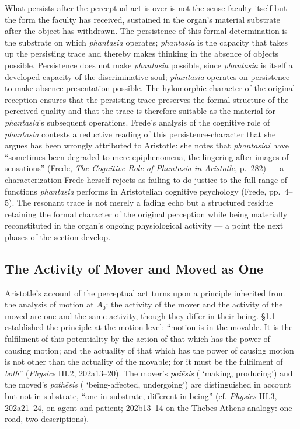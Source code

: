 What persists after the perceptual act is over is not the sense faculty itself but the form the faculty has received, sustained in the organ's material substrate after the object has withdrawn. The persistence of this formal determination is the substrate on which \textit{phantasia} operates; \textit{phantasia} is the capacity that takes up the persisting trace and thereby makes thinking in the absence of objects possible. Persistence does not make \textit{phantasia} possible, since \textit{phantasia} is itself a developed capacity of the discriminative soul; \textit{phantasia} operates on persistence to make absence-presentation possible. The hylomorphic character of the original reception ensures that the persisting trace preserves the formal structure of the perceived quality and that the trace is therefore suitable as the material for \textit{phantasia}'s subsequent operations. Frede's analysis of the cognitive role of \textit{phantasia} contests a reductive reading of this persistence-character that she argues has been wrongly attributed to Aristotle: she notes that \textit{phantasiai} have ``sometimes been degraded to mere epiphenomena, the lingering after-images of sensations'' (Frede, \textit{The Cognitive Role of Phantasia in Aristotle}, p.~282) --- a characterization Frede herself rejects as failing to do justice to the full range of functions \textit{phantasia} performs in Aristotelian cognitive psychology (Frede, pp.~4--5). The resonant trace is not merely a fading echo but a structured residue retaining the formal character of the original perception while being materially reconstituted in the organ's ongoing physiological activity --- a point the next phases of the section develop.

\subsection{The Activity of Mover and Moved as One}

Aristotle's account of the perceptual act turns upon a principle inherited from the analysis of motion at $A_0$: the activity of the mover and the activity of the moved are one and the same activity, though they differ in their being. §1.1 established the principle at the motion-level: ``motion is in the movable. It is the fulfilment of this potentiality by the action of that which has the power of causing motion; and the actuality of that which has the power of causing motion is not other than the actuality of the movable; for it must be the fulfilment of \textit{both}'' (\textit{Physics} III.2, 202a13--20). The mover's \textit{poiēsis} ( `making, producing') and the moved's \textit{pathēsis} ( `being-affected, undergoing') are distinguished in account but not in substrate, ``one in substrate, different in being'' (cf. \textit{Physics} III.3, 202a21--24, on agent and patient; 202b13--14 on the Thebes-Athens analogy: one road, two descriptions).

